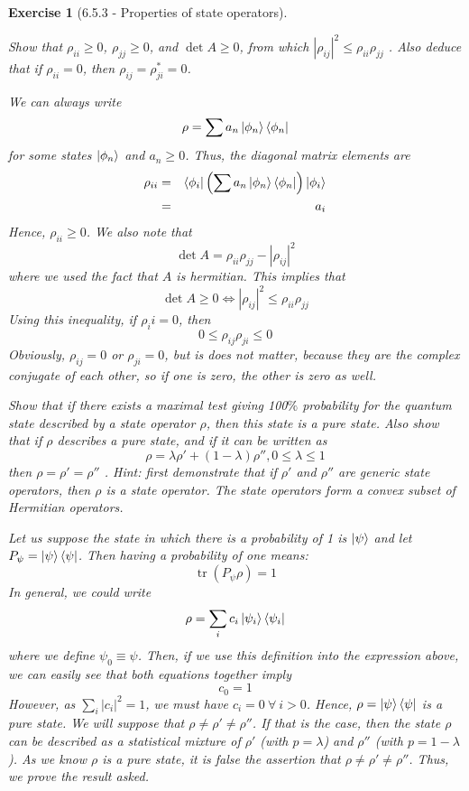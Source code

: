 \documentclass[12pt]{article}
\def\be{\begin{equation}}
\def\ee{\end{equation}}
\def\bea{\begin{eqnarray*}}
\def\eea{\end{eqnarray*}}
\def\l{\left}
\def\r{\right}
\newtheorem{exercise}{Exercise}
\DeclareMathOperator{\tr}{tr}
\begin{document}
	\begin{exercise}[6.5.3 - Properties of state operators]
		\begin{exercises}
			\item Show that $\rho_{ii}\geq 0$, $\rho_{jj}\geq 0$, and $\det{A} \geq 0$, from which $|\rho_{ij}|^2 \leq \rho_{ii} \rho_{jj}$ . Also deduce that if $\rho_{ii} = 0$, then $\rho_{ij} = \rho_{ji}^* = 0$.
			\begin{multianswer}
				We can always write
				\be
					\rho = \sum a_n \ket{\phi_n}\bra{\phi_n}
				\ee
				for some states $\ket{\phi_n}$ and $a_n\geq 0$. Thus, the diagonal matrix elements are
				\bea
					\rho_{ii} &=& \bra{\phi_i} \l(\sum a_n \ket{\phi_n}\bra{\phi_n}\r) \ket{\phi_i} \\
						&=& a_i 
				\eea
				Hence, $\rho_{ii}\geq0$. We also note that
				\be
					\det{A} = \rho_{ii}\rho_{jj} - |\rho_{ij}|^2
				\ee
				where we used the fact that $A$ is hermitian. This implies that
				\be
					\det{A} \geq 0 \iff |\rho_{ij}|^2 \leq \rho_{ii}\rho_{jj}
				\ee
				Using this inequality, if $\rho_ii=0$, then
				\be
					0 \leq \rho_{ij}\rho_{ji} \leq 0
				\ee
				Obviously, $\rho_{ij}=0$ or $\rho_{ji}=0$, but is does not matter, because they are the complex conjugate of each other, so if one is zero, the other is zero as well.				
			\end{multianswer}
			
			\item Show that if there exists a maximal test giving 100$\%$ probability for the quantum state described
			by a state operator $\rho$, then this state is a pure state. Also show that if $\rho$ describes a pure state,
			and if it can be written as
			\be
				\rho = \lambda\rho' + (1 - \lambda)\rho'', 0 \leq \lambda 
				\leq 1
			\ee
			then $\rho=\rho'=\rho''$ . Hint: first demonstrate that if $\rho'$ and $\rho''$ are generic state operators, then $\rho$ is
			a state operator. The state operators form a convex subset of Hermitian operators.
			\begin{multianswer}[true]
				Let us suppose the state in which there is a probability of 1 is $\ket{\psi}$ and let $P_\psi=\ket{\psi}\bra{\psi}$. Then having a probability of one means:
				\be
					\tr\l( P_\psi\rho\r) = 1
				\ee
				In general, we could write
				\be
					\rho = \sum_i c_i \ket{\psi_i}\bra{\psi_i}
				\ee
				where we define $\psi_0\equiv\psi$. Then, if we use this definition into the expression above, we can easily see that both equations together imply
				\be
					c_0 = 1
				\ee
				However, as $\sum_i |c_i|^2 = 1$, we must have $c_i=0\ \forall\ i>0$. Hence, $\rho=\ket{\psi}\bra{\psi}$ is a pure state. We will suppose that $\rho\not=\rho'\not=\rho''$. If that is the case, then the state $\rho$ can be described as a statistical mixture of $\rho'$ (with $p=\lambda$) and $\rho''$ (with $p=1-\lambda$). As we know $\rho$ is a pure state, it is false the assertion that $\rho\not=\rho'\not=\rho''$. Thus, we prove the result asked.  
			\end{multianswer}
		\end{exercises}
	\end{exercise}
	
\end{document}
